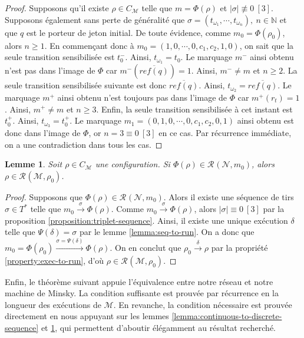 \documentclass{article}
\newtheorem{lemma}{Lemme}
\theoremstyle{remark}
\theoremstyle{remark}
\newcommand{\reach}[3][]{\mathcal{R}^{#1}(\mathcal{#2}, #3)}
\newcommand{\reaches}[1][]{\xrightarrow{#1}}
\begin{document}
\begin{proof}
    Supposons qu'il existe $\rho \in C_{\mathcal{M}}$ telle que $m = \Phi(\rho)$ et $|\sigma| \not\equiv 0\ [3]$. Supposons également sans perte de généralité que $\sigma = (t_{\omega_1}, \cdots, t_{\omega_n}),\ n \in \mathbb{N}$ et que $q$ est le porteur de jeton initial. De toute évidence, comme $m_0 = \Phi(\rho_0)$, alors $n \geq 1$.
    En commençant donc à $m_0 = (1, 0, \cdots, 0, c_1, c_2, 1, 0)$, on sait que la seule transition sensibilisée est $t_0^-$. Ainsi, $t_{\omega_1} = t_0$. Le marquage $m^-$ ainsi obtenu n'est pas dans l'image de $\Phi$ car $m^-(\overline{ref(q)}) = 1$. Ainsi, $m^- \neq m$ et $n \geq 2$.
    La seule transition sensibilisée suivante est donc $\overline{ref(q)}$. Ainsi, $t_{\omega_2} = \overline{ref(q)}$. Le marquage $m^+$ ainsi obtenu n'est toujours pas dans l'image de $\Phi$ car $m^+(r_t) = 1$. Ainsi, $m^+ \neq m$ et $n \geq 3$.
    Enfin, la seule transition sensibilisée à cet instant est $t_0^+$. Ainsi, $t_{\omega_3} = t_0^+$. Le marquage $m_1 = (0, 1, 0, \cdots, 0, c_1, c_2, 0, 1)$ ainsi obtenu est donc dans l'image de $\Phi$, or $n = 3 \equiv 0\ [3]$ en ce cas. Par récurrence immédiate, on a une contradiction dans tous les cas.
\end{proof}

\begin{lemma}
    \label{lemma:sequence-unwrap-to-execution}
    Soit $\rho \in C_{\mathcal{M}}$ une configuration. Si $\Phi(\rho) \in \reach{N}{m_0}$, alors $\rho \in \reach{M}{\rho_0}$.
\end{lemma}

\begin{proof}
    Supposons que $\Phi(\rho) \in \reach{N}{m_0}$. Alors il existe une séquence de tirs $\sigma \in T^*$ telle que $m_0 \reaches[\sigma] \Phi(\rho)$. Comme $m_0 \reaches[\sigma] \Phi(\rho)$, alors $|\sigma| \equiv 0\ [3]$ par la proposition \ref{proposition:triplet-sequence}. Ainsi, il existe une unique exécution $\delta$ telle que $\Psi(\delta) = \sigma$ par le lemme \ref{lemma:seq-to-run}. On a donc que $m_0 = \Phi(\rho_0) \reaches[\sigma = \Psi(\delta)] \Phi(\rho)$. On en conclut que $\rho_0 \reaches[\delta] \rho$ par la propriété \ref{property:exec-to-run}, d'où $\rho \in \reach{M}{\rho_0}$.
\end{proof}

Enfin, le théorème suivant appuie l'équivalence entre notre réseau et notre machine de Minsky. La condition suffisante est prouvée par récurrence en la longueur des exécutions de $\mathcal{M}$. En revanche, la condition nécessaire est prouvée directement en nous appuyant sur les lemmes \ref{lemma:continuous-to-discrete-sequence} et \ref{lemma:sequence-unwrap-to-execution}, qui permettent d'aboutir élégamment au résultat recherché.
\end{document}
